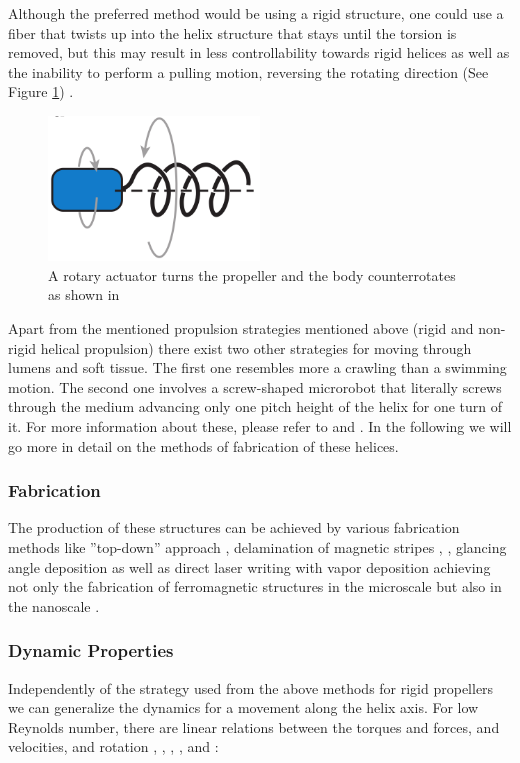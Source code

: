 Although the preferred method would be using a rigid structure, one could use a fiber that twists up into the helix structure that stays until the torsion is removed, but this may result in less controllability towards rigid helices as well as the inability to perform a pulling motion, reversing the rotating direction (See Figure \ref{fig:rotatingflagella}) \cite{Nelson2010}. \\

\begin{figure}[ht]
	\centering
  \includegraphics[width=0.5\textwidth]{Pictures/rotatingflagella.png}
	\caption{A rotary actuator turns the propeller and the body counterrotates as shown in \cite{Nelson2010}}
	\label{fig:rotatingflagella}
\end{figure}

Apart from the mentioned propulsion strategies mentioned above (rigid and non-rigid helical propulsion) there exist two other strategies for moving through lumens and soft tissue. The first one resembles more a crawling than a swimming motion. The second one involves a screw-shaped microrobot that literally screws through the medium advancing only one pitch height of the helix for one turn of it. For more information about these, please refer to \cite{Sendoh2003} and \cite{Ikeuchi1997}. In the following we will go more in detail on the methods of fabrication of these helices. 

\subsubsection{Fabrication}
The production of these structures can be achieved by various fabrication methods like ''top-down'' approach \cite{Zhang2009}, delamination of magnetic stripes \cite{Smith2011}, , glancing angle deposition \cite{Ghosh2009} as well as direct laser writing with vapor deposition \cite{Tottori2012} achieving not only the fabrication of ferromagnetic structures in the microscale but also in the nanoscale \cite{Schamel2014}.


\subsubsection{Dynamic Properties}
Independently of the strategy used from the above methods for rigid propellers we can generalize the dynamics for a movement along the helix axis. For low Reynolds number, there are linear relations between the torques and forces, and velocities, and rotation \cite{Tottori2012}, \cite{Peyer2013}, \cite{Peyer2010}, \cite{Rodenborn2013}, \cite{Behkam2006} and \cite{Abbott2010}:\\

